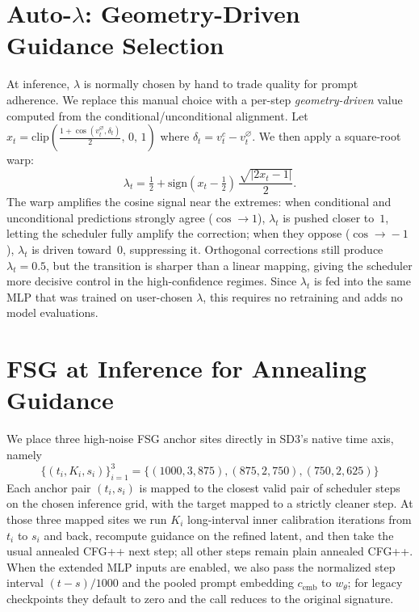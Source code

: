 \documentclass[acmtog]{acmart}
\begin{document}
\section{Auto-$\lambda$: Geometry-Driven Guidance Selection}
At inference, $\lambda$ is normally chosen by hand to trade quality for prompt adherence. We replace this manual choice with a per-step \emph{geometry-driven} value computed from the conditional/unconditional alignment. Let $x_t = \mathrm{clip}\!\left(\tfrac{1+\cos(v_t^{\varnothing},\delta_t)}{2},\,0,\,1\right)$ where $\delta_t = v_t^c - v_t^{\varnothing}$. We then apply a square-root warp:
\begin{equation}
\lambda_t = \tfrac{1}{2} + \mathrm{sign}(x_t - \tfrac{1}{2})\,\frac{\sqrt{|2x_t - 1|}}{2}.
\end{equation}
The warp amplifies the cosine signal near the extremes: when conditional and unconditional predictions strongly agree ($\cos\!\to\!1$), $\lambda_t$ is pushed closer to~$1$, letting the scheduler fully amplify the correction; when they oppose ($\cos\!\to\!{-}1$), $\lambda_t$ is driven toward~$0$, suppressing it. Orthogonal corrections still produce $\lambda_t\!=\!0.5$, but the transition is sharper than a linear mapping, giving the scheduler more decisive control in the high-confidence regimes. Since $\lambda_t$ is fed into the same MLP that was trained on user-chosen $\lambda$, this requires no retraining and adds no model evaluations.

\section{FSG at Inference for Annealing Guidance}
We place three high-noise FSG anchor sites directly in SD3's native time axis, namely 
\begin{equation}
    \{(t_i,K_i,s_i)\}_{i=1}^{3}=\{(1000,3,875),(875,2,750),(750,2,625)\}
\end{equation}
Each anchor pair $(t_i,s_i)$ is mapped to the closest valid pair of scheduler steps on the chosen inference grid, with the target mapped to a strictly cleaner step. At those three mapped sites we run $K_i$ long-interval inner calibration iterations from $t_i$ to $s_i$ and back, recompute guidance on the refined latent, and then take the usual annealed CFG++ next step; all other steps remain plain annealed CFG++. When the extended MLP inputs are enabled, we also pass the normalized step interval $(t-s)/1000$ and the pooled prompt embedding $c_{\text{emb}}$ to $w_\theta$; for legacy checkpoints they default to zero and the call reduces to the original signature.
\end{document}
